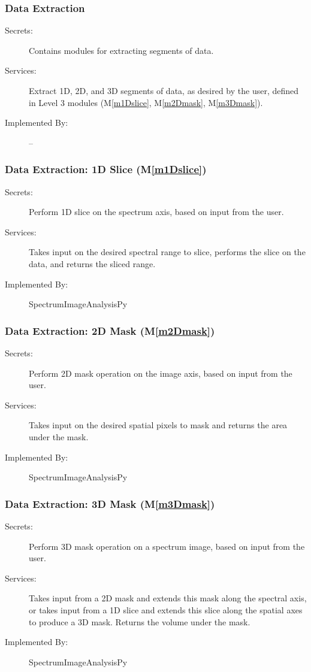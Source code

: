 \documentclass[12pt, titlepage]{article}
\newcommand{\mref}[1]{M\ref{#1}}
\newcommand{\progname}{SpectrumImageAnalysisPy}
\begin{document}
\subsubsection{Data Extraction}
\begin{description}
	\item[Secrets:]Contains modules for extracting segments of data.
	\item[Services:]Extract 1D, 2D, and 3D segments of data, as desired by the
user, defined in Level 3 modules (\mref{m1Dslice}, \mref{m2Dmask},
\mref{m3Dmask}).
	\item[Implemented By:] --
\end{description}

\subsubsection{Data Extraction: 1D Slice (\mref{m1Dslice})}
\begin{description}
	\item[Secrets:]Perform 1D slice on the spectrum axis, based on input from the
user.
	\item[Services:]Takes input on the desired spectral range to slice, performs
the slice on the data, and returns the sliced range.
	\item[Implemented By:] \progname
\end{description}

\subsubsection{Data Extraction: 2D Mask (\mref{m2Dmask})}
\begin{description}
	\item[Secrets:]Perform 2D mask operation on the image axis, based on input from
the user.
	\item[Services:]Takes input on the desired spatial pixels to mask and returns
the area under the mask.
	\item[Implemented By:] \progname
\end{description}

\subsubsection{Data Extraction: 3D Mask (\mref{m3Dmask})}
\begin{description}
	\item[Secrets:]Perform 3D mask operation on a spectrum image, based on input
from the user.
	\item[Services:]Takes input from a 2D mask and extends this mask along the
spectral axis, or takes input from a 1D slice and extends this slice along the
spatial axes to produce a 3D mask. Returns the volume under the mask.
	\item[Implemented By:] \progname
\end{description}
\end{document}
